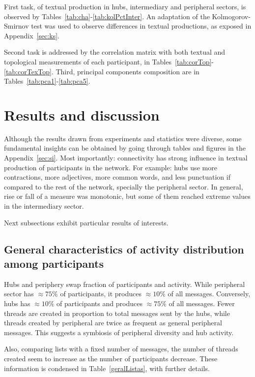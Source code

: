 \documentclass[%
 aip,
 jmp,%
 amsmath,amssymb,
 reprint,%
]{revtex4-1}
\begin{document}
First task, of textual production in hubs, intermediary and peripheral sectors, is observed by Tables~\ref{tab:cha}-\ref{tab:kolPctInter}. An adaptation of the Kolmogorov-Smirnov test was used to observe differences in textual productions, as exposed in Appendix~\ref{sec:ks}.

Second task is addressed by the correlation matrix with both textual and topological measurements of each participant, in Tables~\ref{tab:corTop}-\ref{tab:corTexTop}. Third, principal components composition are in Tables~\ref{tab:pca1}-\ref{tab:pca5}. 

\section{Results and discussion}\label{sec:results}

Although the results drawn from experiments and statistics were diverse, some fundamental insights can be obtained by going through tables and figures in the Appendix~\ref{sec:si}. Most importantly: connectivity has strong influence in textual production of participants in the network. For example: hubs use more contractions, more adjectives, more common words, and less punctuation if compared to the rest of the network, specially the peripheral sector. In general, rise or fall of a measure was monotonic, but some of them reached extreme values in the intermediary sector.

Next subsections exhibit particular results of interests.

\subsection{General characteristics of activity distribution among participants}\label{sec:gen}
Hubs and periphery swap fraction of participants and activity. While peripheral sector has $\approx 75\%$ of participants, it produces $\approx 10\%$ of all messages. Conversely, hubs has $\approx 10\%$ of participants and produces $\approx 75\%$ of all messages. Fewer threads are created in proportion to total messages sent by the hubs, while threads created by peripheral are twice as frequent as general peripheral messages.
This suggests a symbiosis of peripheral diversity and hub activity. 

Also, comparing lists with a fixed number of messages, the number of threads created seem to increase as the number of participants decrease. These information is condensed in Table~\ref{geralListas}, with further details.
\end{document}
